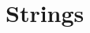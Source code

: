 \documentclass{article}
\renewcommand{\sec}[1]{\label{sec:#1}}
\begin{document}
\section{Strings}
\sec{strings}

% 
% 
% 
% 
\end{document}
